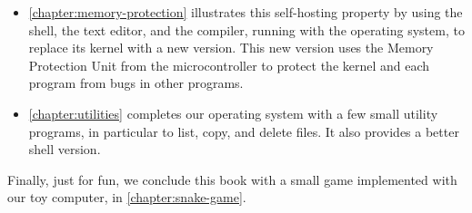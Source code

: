 \begin{itemize}
\item \cref{chapter:memory-protection} illustrates this self-hosting property by
using the shell, the text editor, and the compiler, running with the operating
system, to replace its kernel with a new version. This new version uses the
Memory Protection Unit from the microcontroller to protect the kernel and each
program from bugs in other programs.

\item \cref{chapter:utilities} completes our operating system with a few small
utility programs, in particular to list, copy, and delete files. It also
provides a better shell version.
\end{itemize}

Finally, just for fun, we conclude this book with a small game implemented with
our toy computer, in \cref{chapter:snake-game}.
